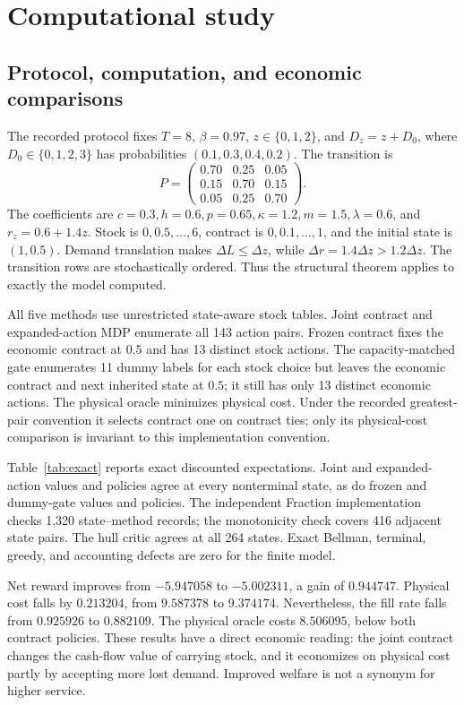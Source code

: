 \section{Computational study}\label{sec:experiments}
\subsection{Protocol, computation, and economic comparisons}
The recorded protocol fixes $T=8$, $\beta=0.97$, $z\in\{0,1,2\}$, and $D_z=z+D_0$, where $D_0\in\{0,1,2,3\}$ has probabilities $(0.1,0.3,0.4,0.2)$. The transition is
\[
 P=\begin{pmatrix}0.70&0.25&0.05\\0.15&0.70&0.15\\0.05&0.25&0.70\end{pmatrix}.
\]
The coefficients are $c=0.3,h=0.6,p=0.65,\kappa=1.2,m=1.5,\lambda=0.6$, and $r_z=0.6+1.4z$. Stock is $0,0.5,\ldots,6$, contract is $0,0.1,\ldots,1$, and the initial state is $(1,0.5)$. Demand translation makes $\Delta L\leq\Delta z$, while $\Delta r=1.4\Delta z>1.2\Delta z$. The transition rows are stochastically ordered. Thus the structural theorem applies to exactly the model computed.

All five methods use unrestricted state-aware stock tables. Joint contract and expanded-action MDP enumerate all 143 action pairs. Frozen contract fixes the economic contract at $0.5$ and has 13 distinct stock actions. The capacity-matched gate enumerates 11 dummy labels for each stock choice but leaves the economic contract and next inherited state at $0.5$; it still has only 13 distinct economic actions. The physical oracle minimizes physical cost. Under the recorded greatest-pair convention it selects contract one on contract ties; only its physical-cost comparison is invariant to this implementation convention.

Table~\ref{tab:exact} reports exact discounted expectations. Joint and expanded-action values and policies agree at every nonterminal state, as do frozen and dummy-gate values and policies. The independent Fraction implementation checks 1,320 state--method records; the monotonicity check covers 416 adjacent state pairs. The hull critic agrees at all 264 states. Exact Bellman, terminal, greedy, and accounting defects are zero for the finite model.

Net reward improves from $-5.947058$ to $-5.002311$, a gain of $0.944747$. Physical cost falls by $0.213204$, from $9.587378$ to $9.374174$. Nevertheless, the fill rate falls from $0.925926$ to $0.882109$. The physical oracle costs $8.506095$, below both contract policies. These results have a direct economic reading: the joint contract changes the cash-flow value of carrying stock, and it economizes on physical cost partly by accepting more lost demand. Improved welfare is not a synonym for higher service.

